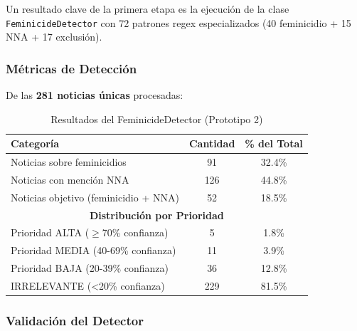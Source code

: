 Un resultado clave de la primera etapa es la ejecución de la clase \texttt{FeminicideDetector} con 72 patrones regex especializados (40 feminicidio + 15 NNA + 17 exclusión).

\subsubsection{Métricas de Detección}

De las \textbf{281 noticias únicas} procesadas:

\begin{table}[h]
\centering
\caption{Resultados del FeminicideDetector (Prototipo 2)}
\begin{tabular}{|l|c|c|}
\hline
\textbf{Categoría} & \textbf{Cantidad} & \textbf{\% del Total} \\ \hline
Noticias sobre feminicidios & 91 & 32.4\% \\ \hline
Noticias con mención NNA & 126 & 44.8\% \\ \hline
Noticias objetivo (feminicidio + NNA) & 52 & 18.5\% \\ \hline
\multicolumn{3}{|c|}{\textbf{Distribución por Prioridad}} \\ \hline
Prioridad ALTA ($\geq$70\% confianza) & 5 & 1.8\% \\ \hline
Prioridad MEDIA (40-69\% confianza) & 11 & 3.9\% \\ \hline
Prioridad BAJA (20-39\% confianza) & 36 & 12.8\% \\ \hline
IRRELEVANTE (<20\% confianza) & 229 & 81.5\% \\ \hline
\end{tabular}
\end{table}

\subsubsection{Validación del Detector}

